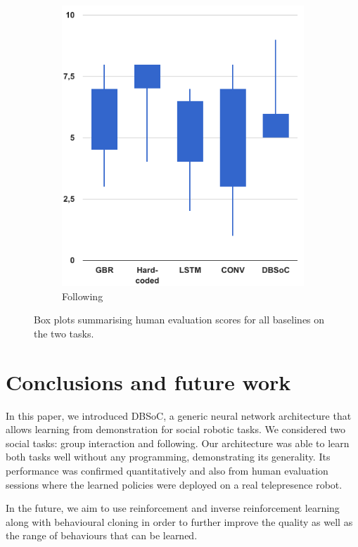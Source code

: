\documentclass[letterpaper, 10 pt, conference]{ieeeconf}
\begin{document}
\begin{figure}[tbh]
\begin{subfigure}[b]{0.40\columnwidth}
    \includegraphics[scale = 0.30]{images/follow_candle.png}
    \caption{Following}
    \label{fig:follow-res}
  \end{subfigure} 

  \caption{Box plots summarising human evaluation scores for all baselines on the two tasks.}
  \label{fig:human}
    \vspace{-5mm}
  \end{figure}


\section{Conclusions and future work} 

In this paper, we introduced DBSoC, a generic neural network architecture that allows learning from demonstration for social robotic tasks. We considered two social tasks: group interaction and following. Our architecture was able to learn both tasks well without any programming, demonstrating its generality. Its performance was confirmed quantitatively and also from human evaluation sessions where the learned policies were deployed on a real telepresence robot. 

In the future, we aim to use reinforcement and inverse reinforcement learning along with behavioural cloning in order to further improve the quality as well as the range of behaviours that can be learned.   



\end{document}
